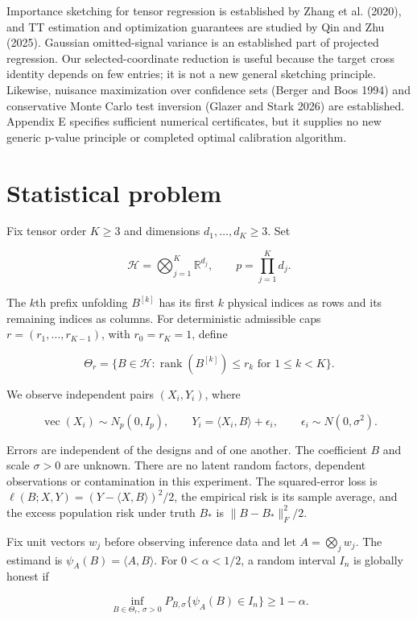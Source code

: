 \documentclass[
  11pt,
]{article}
\begin{document}
Importance sketching for tensor regression is established by Zhang et
al. (2020), and TT estimation and optimization guarantees are studied by
Qin and Zhu (2025). Gaussian omitted-signal variance is an established
part of projected regression. Our selected-coordinate reduction is
useful because the target cross identity depends on few entries; it is
not a new general sketching principle. Likewise, nuisance maximization
over confidence sets (Berger and Boos 1994) and conservative Monte Carlo
test inversion (Glazer and Stark 2026) are established. Appendix E
specifies sufficient numerical certificates, but it supplies no new
generic p-value principle or completed optimal calibration algorithm.

\section{Statistical problem}\label{statistical-problem}

Fix tensor order \(K\ge3\) and dimensions \(d_1,\ldots,d_K\ge3\). Set

\[
\mathcal H=\bigotimes_{j=1}^K\mathbb R^{d_j},\qquad
p=\prod_{j=1}^K d_j.
\]

The \(k\)th prefix unfolding \(B^{[k]}\) has its first \(k\) physical
indices as rows and its remaining indices as columns. For deterministic
admissible caps \(r=(r_1,\ldots,r_{K-1})\), with \(r_0=r_K=1\), define

\[
\Theta_r=\{B\in\mathcal H:\operatorname{rank}(B^{[k]})\le r_k
\text{ for }1\le k<K\}.
\]

We observe independent pairs \((X_i,Y_i)\), where

\[
\operatorname{vec}(X_i)\sim N_p(0,I_p),\qquad
Y_i=\langle X_i,B\rangle+\epsilon_i,\qquad
\epsilon_i\sim N(0,\sigma^2).
\]

Errors are independent of the designs and of one another. The
coefficient \(B\) and scale \(\sigma>0\) are unknown. There are no
latent random factors, dependent observations or contamination in this
experiment. The squared-error loss is
\(\ell(B;X,Y)=(Y-\langle X,B\rangle)^2/2\), the empirical risk is its
sample average, and the excess population risk under truth \(B_*\) is
\(\|B-B_*\|_F^2/2\).

Fix unit vectors \(w_j\) before observing inference data and let
\(A=\bigotimes_jw_j\). The estimand is \(\psi_A(B)=\langle A,B\rangle\).
For \(0<\alpha<1/2\), a random interval \(I_n\) is globally honest if

\[
\inf_{B\in\Theta_r,\,\sigma>0}
P_{B,\sigma}\{\psi_A(B)\in I_n\}\ge1-\alpha.
\]
\end{document}
